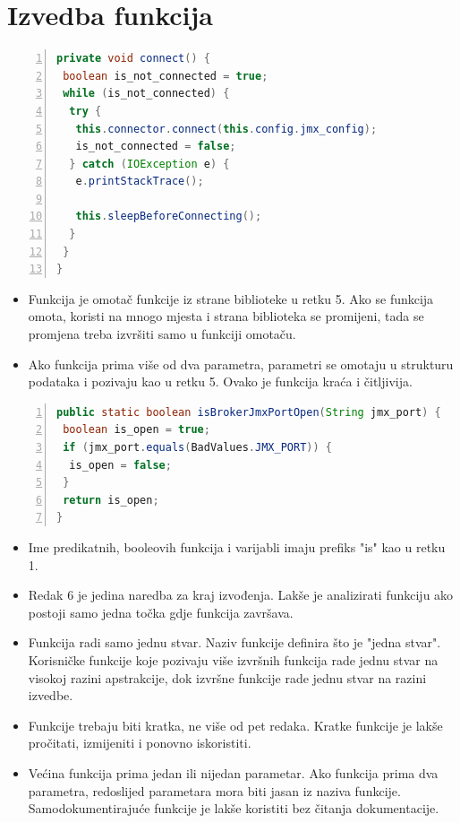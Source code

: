 \documentclass[utf8, diplomski, lmodern, numeric]{fer}
\begin{document}
\section{Izvedba funkcija}

\begin{lstlisting}[floatplacement=H, language=Java, caption={Izvadak iz razreda JMX Connector Facade}, captionpos=b, basicstyle=\footnotesize, numbers=left, stepnumber=1, backgroundcolor=\color{backcolour}, keywordstyle=\color{blue}]
private void connect() {
 boolean is_not_connected = true;
 while (is_not_connected) {
  try {
   this.connector.connect(this.config.jmx_config);
   is_not_connected = false;
  } catch (IOException e) {
   e.printStackTrace();
      
   this.sleepBeforeConnecting();
  }
 }
}
\end{lstlisting}

\begin{itemize}
    \item Funkcija je omotač funkcije iz strane biblioteke u retku 5. Ako se funkcija omota, koristi na mnogo mjesta i strana biblioteka se promijeni, tada se promjena treba izvršiti samo u funkciji omotaču.
    \item Ako funkcija prima više od dva parametra, parametri se omotaju u strukturu podataka i pozivaju kao u retku 5. Ovako je funkcija kraća i čitljivija.
\end{itemize}

\begin{lstlisting}[floatplacement=H, language=Java, caption={Predikatna funkcija}, captionpos=b, basicstyle=\footnotesize, numbers=left, stepnumber=1, backgroundcolor=\color{backcolour}, keywordstyle=\color{blue}]
public static boolean isBrokerJmxPortOpen(String jmx_port) {
 boolean is_open = true;
 if (jmx_port.equals(BadValues.JMX_PORT)) {
  is_open = false;
 }
 return is_open;
}
\end{lstlisting}

\begin{itemize}
    \item Ime predikatnih, booleovih funkcija i varijabli imaju prefiks "is" kao u retku 1.
    \item Redak 6 je jedina naredba za kraj izvođenja. Lakše je analizirati funkciju ako postoji samo jedna točka gdje funkcija završava.
    \item Funkcija radi samo jednu stvar. Naziv funkcije definira što je "jedna stvar". Korisničke funkcije koje pozivaju više izvršnih funkcija rade jednu stvar na visokoj razini apstrakcije, dok izvršne funkcije rade jednu stvar na razini izvedbe.
    \item Funkcije trebaju biti kratka, ne više od pet redaka. Kratke funkcije je lakše pročitati, izmijeniti i ponovno iskoristiti.
    \item Većina funkcija prima jedan ili nijedan parametar. Ako funkcija prima dva parametra, redoslijed parametara mora biti jasan iz naziva funkcije. Samodokumentirajuće funkcije je lakše koristiti bez čitanja dokumentacije.
\end{itemize}
\end{document}
